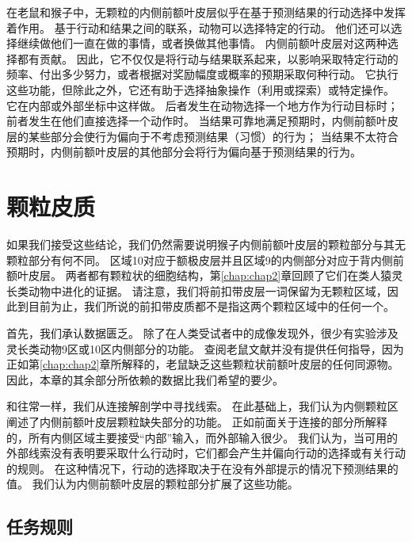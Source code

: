 在老鼠和猴子中，无颗粒的内侧前额叶皮层似乎在基于预测结果的行动选择中发挥着作用。
基于行动和结果之间的联系，动物可以选择特定的行动。
他们还可以选择继续做他们一直在做的事情，或者换做其他事情。
内侧前额叶皮层对这两种选择都有贡献。
因此，它不仅仅是将行动与结果联系起来，以影响采取特定行动的频率、付出多少努力，或者根据对奖励幅度或概率的预期采取何种行动。
它执行这些功能，但除此之外，它还有助于选择抽象操作（利用或探索）或特定操作。
它在内部或外部坐标中这样做。
后者发生在动物选择一个地方作为行动目标时； 前者发生在他们直接选择一个动作时。
当结果可靠地满足预期时，内侧前额叶皮层的某些部分会使行为偏向于不考虑预测结果（习惯）的行为；
当结果不太符合预期时，内侧前额叶皮层的其他部分会将行为偏向基于预测结果的行为。\par



\section{颗粒皮质}

如果我们接受这些结论，我们仍然需要说明猴子内侧前额叶皮层的颗粒部分与其无颗粒部分有何不同。
区域10对应于额极皮层并且区域9的内侧部分对应于背内侧前额叶皮层。
两者都有颗粒状的细胞结构，第\ref{chap:chap2}章回顾了它们在类人猿灵长类动物中进化的证据。
请注意，我们将前扣带皮层一词保留为无颗粒区域，因此到目前为止，我们所说的前扣带皮质都不是指这两个颗粒区域中的任何一个。\par


首先，我们承认数据匮乏。
除了在人类受试者中的成像发现外，很少有实验涉及灵长类动物9区或10区内侧部分的功能。
查阅老鼠文献并没有提供任何指导，因为正如第\ref{chap:chap2}章所解释的，老鼠缺乏这些颗粒状前额叶皮层的任何同源物。
因此，本章的其余部分所依赖的数据比我们希望的要少。\par


和往常一样，我们从连接解剖学中寻找线索。
在此基础上，我们认为内侧颗粒区阐述了内侧前额叶皮层颗粒缺失部分的功能。
正如前面关于连接的部分所解释的，所有内侧区域主要接受“内部”输入，而外部输入很少。
我们认为，当可用的外部线索没有表明要采取什么行动时，它们都会产生并偏向行动的选择或有关行动的规则。
在这种情况下，行动的选择取决于在没有外部提示的情况下预测结果的值。
我们认为内侧前额叶皮层的颗粒部分扩展了这些功能。\par



\subsection{任务规则}

